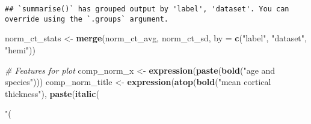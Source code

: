 \documentclass[
]{article}
\newenvironment{Shaded}{\begin{snugshade}}{\end{snugshade}}
\newcommand{\CommentTok}[1]{\textcolor[rgb]{0.56,0.35,0.01}{\textit{#1}}}
\newcommand{\DataTypeTok}[1]{\textcolor[rgb]{0.13,0.29,0.53}{#1}}
\newcommand{\KeywordTok}[1]{\textcolor[rgb]{0.13,0.29,0.53}{\textbf{#1}}}
\newcommand{\NormalTok}[1]{#1}
\newcommand{\StringTok}[1]{\textcolor[rgb]{0.31,0.60,0.02}{#1}}
\begin{document}
\begin{verbatim}
## `summarise()` has grouped output by 'label', 'dataset'. You can override using the `.groups` argument.
\end{verbatim}

\begin{Shaded}
\begin{Highlighting}[]
\NormalTok{norm_ct_stats <-}\StringTok{ }\KeywordTok{merge}\NormalTok{(norm_ct_avg, norm_ct_sd, }\DataTypeTok{by =} \KeywordTok{c}\NormalTok{(}\StringTok{"label"}\NormalTok{, }\StringTok{"dataset"}\NormalTok{, }\StringTok{"hemi"}\NormalTok{))}

\CommentTok{# Features for plot}
\NormalTok{comp_norm_x <-}\StringTok{ }\KeywordTok{expression}\NormalTok{(}\KeywordTok{paste}\NormalTok{(}\KeywordTok{bold}\NormalTok{(}\StringTok{"age and species"}\NormalTok{)))}
\NormalTok{comp_norm_title <-}\StringTok{ }\KeywordTok{expression}\NormalTok{(}\KeywordTok{atop}\NormalTok{(}\KeywordTok{bold}\NormalTok{(}\StringTok{"mean cortical thickness"}\NormalTok{), }\KeywordTok{paste}\NormalTok{(}\KeywordTok{italic}\NormalTok{(}\StringTok{"(% of max thickness)"}\NormalTok{))))}

}
\end{Highlighting}
\end{Shaded}
\end{document}
